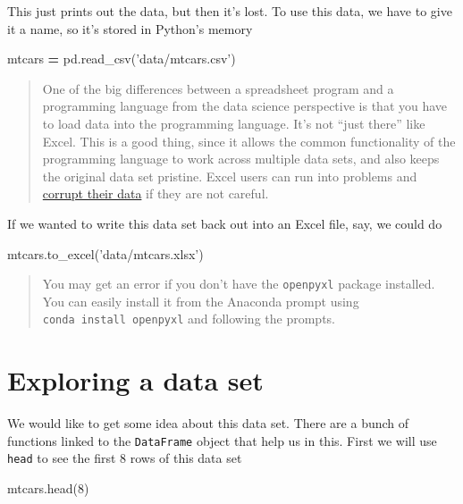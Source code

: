 \documentclass[
  letterpaper,
]{scrbook}
\newenvironment{Shaded}{\begin{snugshade}}{\end{snugshade}}
\newcommand{\DecValTok}[1]{\textcolor[rgb]{0.00,0.00,0.81}{#1}}
\newcommand{\NormalTok}[1]{#1}
\newcommand{\OperatorTok}[1]{\textcolor[rgb]{0.81,0.36,0.00}{\textbf{#1}}}
\newcommand{\StringTok}[1]{\textcolor[rgb]{0.31,0.60,0.02}{#1}}
\begin{document}
This just prints out the data, but then it's lost. To use this data, we have to give it a name, so it's stored in Python's memory

\begin{Shaded}
\begin{Highlighting}[]
\NormalTok{mtcars }\OperatorTok{=}\NormalTok{ pd.read_csv(}\StringTok{'data/mtcars.csv'}\NormalTok{)}
\end{Highlighting}
\end{Shaded}

\begin{quote}
One of the big differences between a spreadsheet program and a programming language from the data science perspective is that you have to load data into the programming language. It's not ``just there'' like Excel. This is a good thing, since it allows the common functionality of the programming language to work across multiple data sets, and also keeps the original data set pristine. Excel users can run into problems and \href{https://nature.berkeley.edu/garbelottoat/?p=1488}{corrupt their data} if they are not careful.
\end{quote}

If we wanted to write this data set back out into an Excel file, say, we could do

\begin{Shaded}
\begin{Highlighting}[]
\NormalTok{mtcars.to_excel(}\StringTok{'data/mtcars.xlsx'}\NormalTok{)}
\end{Highlighting}
\end{Shaded}

\begin{quote}
You may get an error if you don't have the \texttt{openpyxl} package installed. You can easily install it from the Anaconda prompt using \texttt{conda\ install\ openpyxl} and following the prompts.
\end{quote}

\hypertarget{exploring-a-data-set}{%
\section{Exploring a data set}\label{exploring-a-data-set}}

We would like to get some idea about this data set. There are a bunch of functions linked to the \texttt{DataFrame} object that help us in this. First we will use \texttt{head} to see the first 8 rows of this data set

\begin{Shaded}
\begin{Highlighting}[]
\NormalTok{mtcars.head(}\DecValTok{8}\NormalTok{)}
\end{Highlighting}
\end{Shaded}
\end{document}
